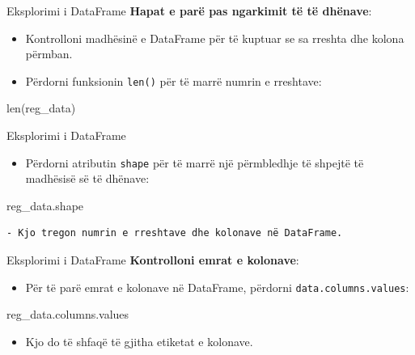 \documentclass[
  ignorenonframetext,
]{beamer}
\newenvironment{Shaded}{\begin{snugshade}}{\end{snugshade}}
\newcommand{\BuiltInTok}[1]{#1}
\newcommand{\NormalTok}[1]{#1}
\providecommand{\tightlist}{%
  \setlength{\itemsep}{0pt}\setlength{\parskip}{0pt}}
\begin{document}
\begin{frame}[fragile]{Eksplorimi i DataFrame}
\protect\hypertarget{eksplorimi-i-dataframe}{}
\textbf{Hapat e parë pas ngarkimit të të dhënave}:

\begin{itemize}
\item
  Kontrolloni madhësinë e DataFrame për të kuptuar se sa rreshta dhe
  kolona përmban.
\item
  Përdorni funksionin \texttt{len()} për të marrë numrin e rreshtave:
\end{itemize}

\begin{Shaded}
\begin{Highlighting}[]
    \BuiltInTok{len}\NormalTok{(reg\_data)}
\end{Highlighting}
\end{Shaded}
\end{frame}

\begin{frame}[fragile]{Eksplorimi i DataFrame}
\protect\hypertarget{eksplorimi-i-dataframe-1}{}
\begin{itemize}
\tightlist
\item
  Përdorni atributin \texttt{shape} për të marrë një përmbledhje të
  shpejtë të madhësisë së të dhënave:
\end{itemize}

\begin{Shaded}
\begin{Highlighting}[]
\NormalTok{    reg\_data.shape}
\end{Highlighting}
\end{Shaded}

\begin{verbatim}
- Kjo tregon numrin e rreshtave dhe kolonave në DataFrame.
\end{verbatim}
\end{frame}

\begin{frame}[fragile]{Eksplorimi i DataFrame}
\protect\hypertarget{eksplorimi-i-dataframe-2}{}
\textbf{Kontrolloni emrat e kolonave}:

\begin{itemize}
\tightlist
\item
  Për të parë emrat e kolonave në DataFrame, përdorni
  \texttt{data.columns.values}:
\end{itemize}

\begin{Shaded}
\begin{Highlighting}[]
\NormalTok{    reg\_data.columns.values}
\end{Highlighting}
\end{Shaded}

\begin{itemize}
\tightlist
\item
  Kjo do të shfaqë të gjitha etiketat e kolonave.
\end{itemize}
\end{frame}
\end{document}
